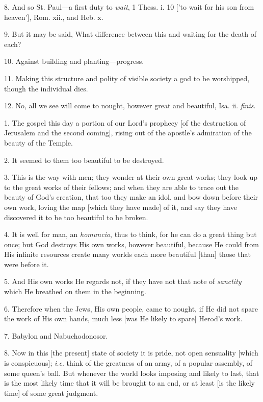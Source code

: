 8. And so St. Paul—a first duty to \emph{wait},
1 Thess. i. 10 ['to wait for his son from heaven'], Rom. xii., and
Heb. x.

9. But it may be said, What difference between
this and waiting for the death of each?

10. Against building and planting—progress.

11. Making this structure and polity of visible
society a god to be worshipped, though the individual dies.

12. No, all we see will come to nought, however
great and beautiful, Isa. ii. \emph{finis}.


1. The gospel this day a portion of our Lord's
prophecy [of the destruction of Jerusalem and the second coming],
rising out of the apostle's admiration of the beauty of the Temple.

2. It seemed to them too beautiful to be
destroyed.

3. This is the way with men; they wonder at their
own great works; they look up to the great works of their fellows; and
when they are able to trace out the beauty of God's creation, that too
they make an idol, and bow down before their own work, loving the map
[which they have made] of it, and say they have discovered it to be
too beautiful to be broken.

4. It is well for man, an \emph{homuncio}, thus
to think, for he can do a great thing but once; but God destroys His
own works, however beautiful, because He could from His infinite
resources create many worlds each more beautiful [than] those that
were before it.

5. And His own works He regards not, if they have
not that note of \emph{sanctity} which He breathed on them in the
beginning.

6. Therefore when the Jews, His own people, came
to nought, if He did not spare the work of His own hands, much less
[was He likely to spare] Herod's work.

7. Babylon and Nabuchodonosor.

8. Now in this [the present] state of society it
is pride, not open sensuality [which is conspicuous]; \emph{i.e}.
think of the greatness of an army, of a popular assembly, of some
queen's ball. But whenever the world looks imposing and likely to
last, that is the most likely time that it will be brought to an end,
or at least [is the likely time] of some great judgment.

